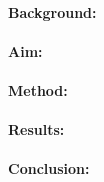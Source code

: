 \justifying
\paragraph{\textbf{Background:}}
\paragraph{\textbf{Aim:}} 
\paragraph{\textbf{Method:}} 
\paragraph{\textbf{Results:}} 
\paragraph{\textbf{Conclusion:}} 
